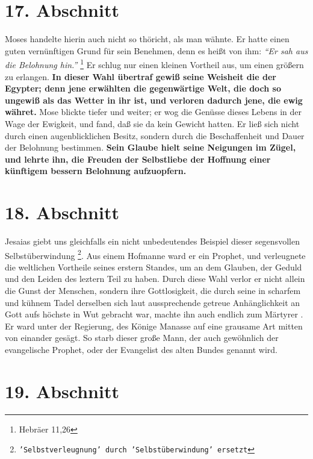 \section{17. Abschnitt} \label{kap4_ab17}

Moses handelte hierin auch nicht so thöricht, als man wähnte. Er hatte einen
guten vernünftigen Grund für sein Benehmen, denn es heißt von ihm:
\textit{"`Er sah aus die Belohnung hin."'}
\footnote{Hebräer 11,26}
Er schlug nur einen kleinen
Vortheil aus, um einen größern zu erlangen. \textbf{In dieser Wahl übertraf
gewiß seine
Weisheit die der Egypter; denn jene erwählten die gegenwärtige Welt, die doch so
ungewiß als das Wetter in ihr ist, und verloren dadurch jene, die ewig währet.}
Mose blickte tiefer und weiter; er wog die Genüsse dieses Lebens in der Wage der
Ewigkeit,  und fand, daß sie da kein Gewicht hatten. Er
ließ sich nicht durch
einen augenblicklichen Besitz, sondern durch die Beschaffenheit und Dauer der
Belohnung bestimmen. \textbf{Sein Glaube hielt seine Neigungen im Zügel, und
lehrte ihn,
die Freuden der Selbstliebe der Hoffnung einer künftigem bessern Belohnung
aufzuopfern.}

\section{18. Abschnitt} \label{kap4_ab18}

 Jesaias giebt uns gleichfalls ein nicht unbedeutendes
Beispiel dieser
segensvollen Selbstüberwindung \footnote{\texttt{'Selbstverleugnung' durch
'Selbstüberwindung' ersetzt}}. Aus einem Hofmanne ward er ein Prophet, und
verleugnete die weltlichen Vortheile seines erstern Standes, um an dem Glauben,
der Geduld und den Leiden des leztern Teil zu haben. Durch diese Wahl verlor er
nicht allein die Gunst der Menschen, sondern ihre Gottlosigkeit, die durch seine
in scharfem und kühnem Tadel derselben sich laut aussprechende getreue
Anhänglichkeit an Gott aufs höchste in Wut gebracht war, machte ihn auch
endlich zum Märtyrer . Er ward unter der Regierung, des Könige
Manasse  auf eine
grausame Art mitten von einander gesägt. So starb dieser große Mann, der auch
gewöhnlich der evangelische Prophet, oder der Evangelist des alten
Bundes genannt wird.

\section{19. Abschnitt} \label{kap4_ab19}

